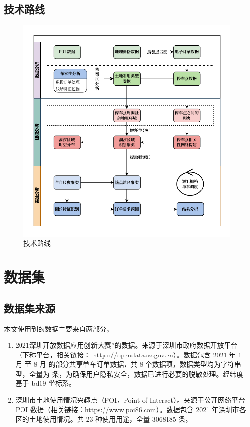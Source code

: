 \documentclass[12pt,a4paper,oneside]{ctexart}
\begin{document}
\subsection{技术路线}
\begin{figure}[H]
    \centering
    \includegraphics[width=\linewidth]{Figs/技术路线.pdf}
    \caption{技术路线}
    \label{fig:技术路线}
\end{figure}
\section{数据集}

\subsection{数据集来源}

本文使用到的数据主要来自两部分，
\begin{enumerate}
    \item 2021深圳开放数据应用创新大赛”的数据。来源于深圳市政府数据开放平台（下称平台，相关链接： \href{https://opendata.sz.gov.cn/data/api/toApiDetails/29200_00403627}{https://opendata.sz.gov.cn}）。数据包含 2021 年 1 月 至 8 月 的部分共享单车订单数据，共 8 个数据项，数据类型均为字符串型，全量为 条，为确保用户隐私安全，数据已进行必要的脱敏处理。经纬度基于 bd09 坐标系。
    \item 深圳市土地使用情况兴趣点（POI，Point of Interact）。来源于公开网络平台 POI 数据（相关链接：\href{https://www.poi86.com/poi/amap/city/440300.html}{https://www.poi86.com}）。数据包含 2021 年深圳市各区的土地使用情况。共 23 种使用用途，全量 3068185 条。

\end{enumerate}
\end{document}
